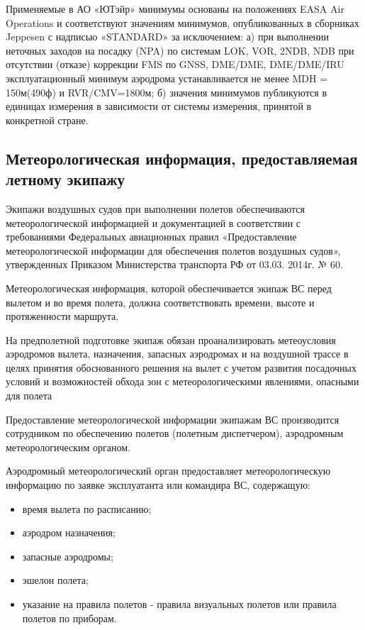 Применяемые в АО «ЮТэйр» минимумы основаны на положениях EASA Air Operations и соответствуют значениям минимумов, опубликованных в сборниках Jeppesen с надписью «STANDARD» за исключением:
а)	при выполнении неточных заходов на посадку (NPA) по системам LOK, VOR, 2NDB, NDB при отсутствии (отказе) коррекции FMS по GNSS, DME/DME, DME/DME/IRU эксплуатационный минимум аэродрома устанавливается не менее MDH = 150м(490ф) и RVR/CMV=1800м;
б)	значения минимумов публикуются в единицах измерения в зависимости от системы измерения, принятой в конкретной стране.


\subsection{Метеорологическая информация, предоставляемая летному экипажу}

Экипажи воздушных судов при выполнении полетов обеспечиваются метеорологической информацией и документацией в соответствии с требованиями Федеральных авиационных правил «Предоставление метеорологической информации для обеспечения полетов воздушных судов», утвержденных Приказом Министерства транспорта РФ от 03.03. 2014г. № 60.

Метеорологическая информация, которой обеспечивается экипаж ВС перед вылетом и во время полета, должна соответствовать времени, высоте и протяженности маршрута.

На предполетной подготовке экипаж обязан проанализировать метеоусловия аэродромов вылета, назначения, запасных аэродромах и на воздушной трассе в целях принятия обоснованного решения на вылет с учетом развития посадочных условий и возможностей обхода зон с метеорологическими явлениями, опасными для полета

Предоставление метеорологической информации экипажам ВС производится сотрудником по обеспечению полетов (полетным диспетчером), аэродромным метеорологическим органом.

Аэродромный метеорологический орган предоставляет метеорологическую информацию по заявке эксплуатанта или командира ВС, содержащую: 
\begin{itemize}
    \item время вылета по расписанию;
    \item аэродром назначения;
    \item запасные аэродромы;
    \item эшелон полета; 
    \item указание на правила полетов - правила визуальных полетов или правила полетов по приборам.
\end{itemize}
 
